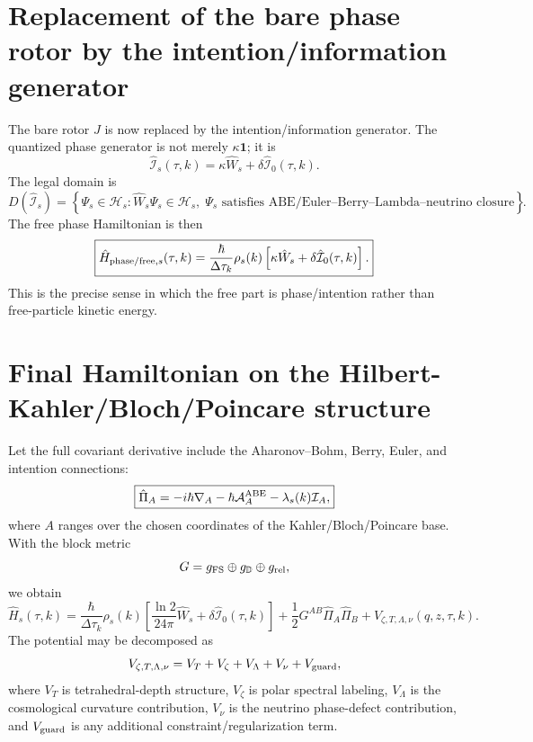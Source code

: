 \documentclass[11pt,a4paper]{article}
\begin{document}
\section{Replacement of the bare phase rotor by the intention/information generator}
The bare rotor $J$ is now replaced by the intention/information generator.  The quantized phase generator is not merely $\kappa\mathbf 1$; it is
\begin{equation}
\boxed{\hat{\mathcal I}_s(\tau,k)=\kappa\hat W_s+\delta\hat{\mathcal I}_0(\tau,k).}
\end{equation}
The legal domain is
\begin{equation}
D(\hat{\mathcal I}_s)=\left\{\Psi_s\in\mathcal H_s:\hat W_s\Psi_s\in\mathcal H_s,\; \Psi_s\text{ satisfies ABE/Euler--Berry--Lambda--neutrino closure}\right\}.
\end{equation}
The free phase Hamiltonian is then
\begin{equation}
\boxed{\hat H_{{\rm phase/free},s}(\tau,k)=\frac{\hbar}{\Delta\tau_k}\rho_s(k)\left[\kappa\hat W_s+\delta\hat{\mathcal I}_0(\tau,k)\right].}
\end{equation}
This is the precise sense in which the free part is phase/intention rather than free-particle kinetic energy.

\section{Final Hamiltonian on the Hilbert-Kahler/Bloch/Poincare structure}
Let the full covariant derivative include the Aharonov--Bohm, Berry, Euler, and intention connections:
\begin{equation}
\boxed{\hat\Pi_A=-i\hbar\nabla_A-\hbar\mathcal A^{\rm ABE}_A-\lambda_s(k)\mathcal I_A,}
\end{equation}
where $A$ ranges over the chosen coordinates of the Kahler/Bloch/Poincare base.  With the block metric
\begin{equation}
G= g_{\rm FS}\oplus g_{\mathbb D}\oplus g_{\rm rel},
\end{equation}
we obtain
\begin{equation}
\boxed{
\hat H_s(\tau,k)=
\frac{\hbar}{\Delta\tau_k}\rho_s(k)\left[\frac{\ln2}{24\pi}\hat W_s+\delta\hat{\mathcal I}_0(\tau,k)\right]
+\frac12G^{AB}\hat\Pi_A\hat\Pi_B
+V_{\zeta,T,\Lambda,\nu}(q,z,\tau,k).
}
\end{equation}
The potential may be decomposed as
\begin{equation}
V_{\zeta,T,\Lambda,\nu}=V_T+V_\zeta+V_\Lambda+V_\nu+V_{\rm guard},
\end{equation}
where $V_T$ is tetrahedral-depth structure, $V_\zeta$ is polar spectral labeling, $V_\Lambda$ is the cosmological curvature contribution, $V_\nu$ is the neutrino phase-defect contribution, and $V_{\rm guard}$ is any additional constraint/regularization term.
\end{document}
